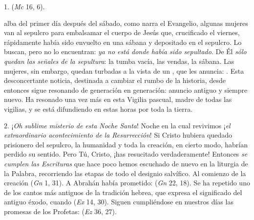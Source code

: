 \begin{body}
1.  (\textit{Mc} 16, 6). 

 alba del primer día después del sábado, como narra el Evangelio, algunas mujeres van al sepulcro para embalsamar el cuerpo de Jesús que, crucificado el viernes, rápidamente había sido envuelto en una sábana y depositado en el sepulcro. Lo buscan, pero no lo encuentran: \textit{ya no está donde había sido sepultado}. De Él \textit{sólo quedan las señales de la sepultura}: la tumba vacía, las vendas, la sábana. Las mujeres, sin embargo, quedan turbadas a la vista de un , que les anuncia: . Esta desconcertante noticia, destinada a cambiar el rumbo de la historia, desde entonces sigue resonando de generación en generación: anuncio antiguo y siempre nuevo. Ha resonado una vez más en esta Vigilia pascual, madre de todas las vigilias, y se está difundiendo en estas horas por toda la tierra.

2. ¡\textit{Oh sublime misterio de esta Noche Santa}! Noche en la cual revivimos ¡\textit{el extraordinario acontecimiento de la Resurrección}! Si Cristo hubiera quedado prisionero del sepulcro, la humanidad y toda la creación, en cierto modo, habrían perdido su sentido. Pero Tú, Cristo, ¡has resucitado verdaderamente! Entonces\textit{ se cumplen las Escrituras} que hace poco hemos escuchado de nuevo en la liturgia de la Palabra, recorriendo las etapas de todo el designio salvífico. Al comienzo de la creación  (\textit{Gn} 1, 31). A Abrahán había prometido:  (\textit{Gn} 22, 18). Se ha repetido uno de los cantos más antiguos de la tradición hebrea, que expresa el significado del antiguo éxodo, cuando  (\textit{Ex} 14, 30). Siguen cumpliéndose en nuestros días las promesas de los Profetas:  (\textit{Ez} 36, 27).


\end{body}
